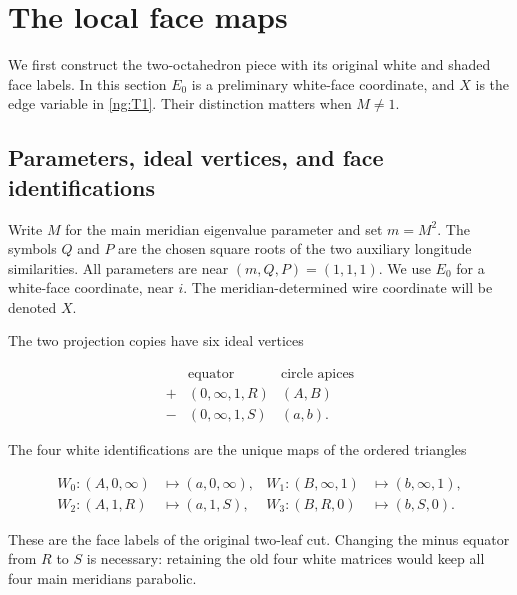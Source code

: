 \section{The local face maps}\label{ng:the-local-face-maps}

We first construct the two-octahedron piece with its original
white and shaded face labels. In this section \(E_0\) is a preliminary
white-face coordinate, and \(X\) is the edge variable in \eqref{ng:T1}.
Their distinction matters when \(M\ne1\).

\subsection{Parameters, ideal vertices, and face identifications}\label{ng:the-parameters-and-the-actual-faces}

Write \(M\) for the main meridian eigenvalue parameter and set
\(m=M^2\). The symbols \(Q\) and \(P\) are the chosen square roots
of the two auxiliary longitude similarities. All parameters are near
\((m,Q,P)=(1,1,1)\). We use \(E_0\) for a white-face
coordinate, near \(i\). The meridian-determined wire coordinate will be
denoted \(X\).

The two projection copies have six ideal vertices

\begin{equation}\label{ng:N1}
\begin{array}{c|c|c}
 &\text{equator}&\text{circle apices}\\ \hline
 +&(0,\infty,1,R)&(A,B)\\
 -&(0,\infty,1,S)&(a,b).
 \end{array}
\end{equation}

The four white identifications are the unique maps of the ordered
triangles

\begin{equation}\label{ng:N2}
\begin{aligned}
 W_0:(A,0,\infty)&\longmapsto(a,0,\infty),&
 W_1:(B,\infty,1)&\longmapsto(b,\infty,1),\\
 W_2:(A,1,R)&\longmapsto(a,1,S),&
 W_3:(B,R,0)&\longmapsto(b,S,0).
\end{aligned}
\end{equation}

These are the face labels of the original two-leaf cut. Changing the
minus equator from \(R\) to \(S\) is necessary: retaining the old
four white matrices would keep all four main meridians parabolic.

